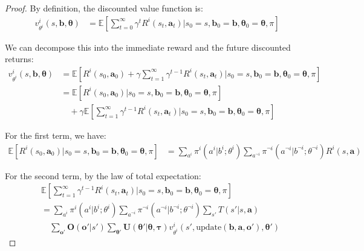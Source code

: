 \documentclass[a4paper,12pt]{report}
\begin{document}
\begin{proof}
    By definition, the discounted value function is:
    \begin{align}
        v^{i}_{\theta^i}(s, \boldsymbol{b}, \boldsymbol{\theta}) & = \mathbb{E}\left[ \sum_{t=0}^{\infty}\gamma^{t} R^{i}(s_{t}, \boldsymbol{a}_{t}) \bigg| s_{0}=s, \boldsymbol{b}_{0}=\boldsymbol{b}, \boldsymbol{\theta}_{0}=\boldsymbol{\theta}, \pi \right]
    \end{align}

    We can decompose this into the immediate reward and the future discounted
    returns:
    \begin{align}
        v^{i}_{\theta^i}(s, \boldsymbol{b}, \boldsymbol{\theta}) & = \mathbb{E}\left[ R^{i}(s_{0}, \boldsymbol{a}_{0}) + \gamma \sum_{t=1}^{\infty}\gamma^{t-1}R^{i}(s_{t}, \boldsymbol{a}_{t}) \bigg| s_{0}=s, \boldsymbol{b}_{0}=\boldsymbol{b}, \boldsymbol{\theta}_{0}=\boldsymbol{\theta}, \pi \right] \\
                                                                 & = \mathbb{E}\left[ R^{i}(s_{0}, \boldsymbol{a}_{0}) \bigg| s_{0}=s, \boldsymbol{b}_{0}=\boldsymbol{b}, \boldsymbol{\theta}_{0}=\boldsymbol{\theta}, \pi \right] \nonumber                                                                \\
                                                                 & \quad + \gamma \mathbb{E}\left[ \sum_{t=1}^{\infty}\gamma^{t-1}R^{i}(s_{t}, \boldsymbol{a}_{t}) \bigg| s_{0}=s, \boldsymbol{b}_{0}=\boldsymbol{b}, \boldsymbol{\theta}_{0}=\boldsymbol{\theta}, \pi \right]
    \end{align}

    For the first term, we have:
    \begin{align}
        \mathbb{E}\left[ R^{i}(s_{0}, \boldsymbol{a}_{0}) \bigg| s_{0}=s, \boldsymbol{b}_{0}=\boldsymbol{b}, \boldsymbol{\theta}_{0}=\boldsymbol{\theta}, \pi \right] & = \sum_{a^i}\pi^{i}(a^{i}|b^{i}; \theta^{i}) \sum_{a^{\neg i}}\pi^{\neg i}(a^{\neg i}|b^{\neg i}; \theta^{\neg i}) R^{i}(s, \boldsymbol{a})
    \end{align}

    For the second term, by the law of total expectation:
    \begin{align}
         & \mathbb{E}\left[ \sum_{t=1}^{\infty}\gamma^{t-1}R^{i}(s_{t}, \boldsymbol{a}_{t}) \bigg| s_{0}=s, \boldsymbol{b}_{0}=\boldsymbol{b}, \boldsymbol{\theta}_{0}=\boldsymbol{\theta}, \pi \right]                                                                                     \\
         & = \sum_{a^i}\pi^{i}(a^{i}|b^{i}; \theta^{i}) \sum_{a^{\neg i}}\pi^{\neg i}(a^{\neg i}|b^{\neg i}; \theta^{\neg i}) \sum_{s'}T(s'|s, \boldsymbol{a}) \nonumber                                                                                                                    \\
         & \quad \sum_{\boldsymbol{o}'}\boldsymbol{O}(\boldsymbol{o}'|s') \sum_{\boldsymbol{\theta}'}\boldsymbol{U}(\boldsymbol{\theta}'|\boldsymbol{\theta}, \boldsymbol{\tau}) v^{i}_{\theta^i}(s', \text{update}(\boldsymbol{b}, \boldsymbol{a}, \boldsymbol{o}'), \boldsymbol{\theta}')
    \end{align}


\end{proof}
\end{document}
